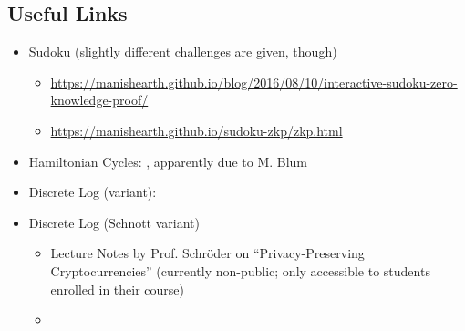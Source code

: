 \documentclass[border=1cm,varwidth=37cm]{standalone}
\begin{document}
\subsection*{Useful Links}
\begin{itemize}
	\item Sudoku (slightly different challenges are given, though)\begin{itemize}
		\item \url{https://manishearth.github.io/blog/2016/08/10/interactive-sudoku-zero-knowledge-proof/}
		\item \url{https://manishearth.github.io/sudoku-zkp/zkp.html}
	\end{itemize}
	\item Hamiltonian Cycles: \cite{wiki:zero-knowledge-proofs-hamiltonian-graphs}, apparently due to M. Blum
	\item Discrete Log (variant): \cite{wiki:zero-knowledge-proofs-discrete-log}
	\item Discrete Log (Schnott variant)\begin{itemize}
		\item Lecture Notes by Prof. Schröder on \enquote{Privacy-Preserving Cryptocurrencies} (currently non-public; only accessible to students enrolled in their course)
		\item \cite{SchnorrZeroKnowledge}
	\end{itemize}
\end{itemize}

\printbibliography[heading=subbibliography]
\end{document}
